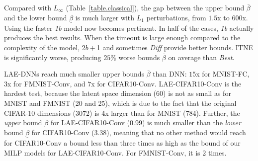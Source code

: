  Compared with $L_\infty$ (Table~\ref{table.classical}), the gap between the upper bound $\bar{\beta}$ and 
the lower bound $\underline{\beta}$ is much larger with 
$L_1$ perturbations, from $1.5$x to $600$x. Using 
the faster {\em 1b} model now becomes pertinent. In half of the cases, {\em 1b} actually produces the best results. When the timeout is large enough compared to the complexity of the model, 2$b+$1 and sometimes {\em Diff} provide better bounds. ITNE is significantly worse, producing $25\%$ worse bounds 
$\bar{\beta}$ on average than {\em Best}.

LAE-DNNs reach much smaller upper bounds $\bar{\beta}$ than DNN: $15$x for MNIST-FC, $3$x for FMNIST-Conv, and $7$x for CIFAR10-Conv. 
LAE-CIFAR10-Conv is the hardest test, because the latent space dimension (60) is not as small as for MNIST and FMNIST (20 and 25), which is due to the fact that the original CIFAR-10 dimensions (3072) is 4x larger than for MNIST (784).
Further, the {\em upper} bound $\bar{\beta}$ for LAE-CIFAR10-Conv (0.99) is much smaller than the {\em lower} bound $\underline{\beta}$ 
for CIFAR10-Conv (3.38), meaning that no other method 
would reach for CIFAR10-Conv a bound less than three times as high as the bound of our MILP models for LAE-CIFAR10-Conv. For FMNIST-Conv, it is 2 times.



	


